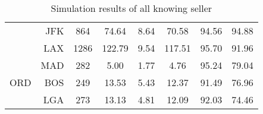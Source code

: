 \begin{table}[h]
\begin{center}
\begin{tabular}{l r c c c c c c}
~    &  JFK  &     864  &   74.64  &   8.64  &   70.58  &   94.56  &   94.88 \\
~    &  LAX  &    1286  &  122.79  &   9.54  &  117.51  &   95.70  &   91.96 \\
~    &  MAD  &     282  &    5.00  &   1.77  &    4.76  &   95.24  &   79.04 \\[.5ex]
ORD  &  BOS  &     249  &   13.53  &   5.43  &   12.37  &   91.49  &   76.96 \\
~    &  LGA  &     273  &   13.13  &   4.81  &   12.09  &   92.03  &   74.46 \\
            \bottomrule
        \end{tabular}
        \caption{Simulation results of all knowing seller}
        \label{tbl:resultsAllKnowing}
    \end{center}
\end{table}


